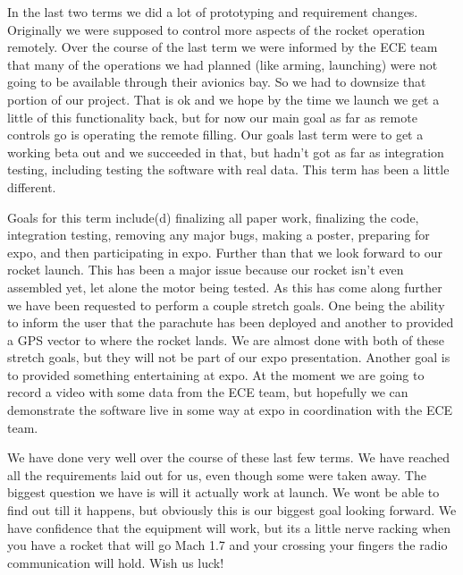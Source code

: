 \documentclass[10pt,draftclsnofoot,onecolumn]{IEEEtran}
\begin{document}
In the last two terms we did a lot of prototyping and requirement changes. Originally we were supposed to control more aspects of the rocket operation remotely. Over the course of the last term we were informed by the ECE team that many of the operations we had planned (like arming, launching) were not going to be available through their avionics bay. So we had to downsize that portion of our project. That is ok and we hope by the time we launch we get a little of this functionality back, but for now our main goal as far as remote controls go is operating the remote filling. Our goals last term were to get a working beta out and we succeeded in that, but hadn't got as far as integration testing, including testing the software with real data. This term has been a little different. \par

Goals for this term include(d) finalizing all paper work, finalizing the code, integration testing, removing any major bugs, making a poster, preparing for expo, and then participating in expo. Further than that we look forward to our rocket launch. This has been a major issue because our rocket isn't even assembled yet, let alone the motor being tested. As this has come along further we have been requested to perform a couple stretch goals. One being the ability to inform the user that the parachute has been deployed and another to provided a GPS vector to where the rocket lands. We are almost done with both of these stretch goals, but they will not be part of our expo presentation. Another goal is to provided something entertaining at expo. At the moment we are going to record a video with some data from the ECE team, but hopefully we can demonstrate the software live in some way at expo in coordination with the ECE team. \par

We have done very well over the course of these last few terms. We have reached all the requirements laid out for us, even though some were taken away. The biggest question we have is will it actually work at launch. We wont be able to find out till it happens, but obviously this is our biggest goal looking forward. We have confidence that the equipment will work, but its a little nerve racking when you have a rocket that will go Mach 1.7 and your crossing your fingers the radio communication will hold. Wish us luck! \par
\end{document}
